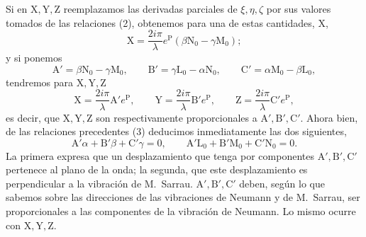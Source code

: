 Si en $\mathrm X,\mathrm Y,\mathrm Z$ reemplazamos las derivadas parciales
de $\xi,\eta,\zeta$ por sus valores tomados de las relaciones (2),
obtenemos para una de estas cantidades, $\mathrm X$,
\[
\mathrm X=\frac{2i\pi}{\lambda}e^{\mathrm P}(\beta\mathrm N_0-\gamma\mathrm M_0);
\]
y si ponemos
\begin{equation}
\mathrm A'=\beta\mathrm N_0-\gamma\mathrm M_0,\qquad
\mathrm B'=\gamma\mathrm L_0-\alpha\mathrm N_0,\qquad
\mathrm C'=\alpha\mathrm M_0-\beta\mathrm L_0,
\tag{3}
\end{equation}
tendremos para $\mathrm X,\mathrm Y,\mathrm Z$
\[
\mathrm X=\frac{2i\pi}{\lambda}\mathrm A'e^{\mathrm P},\qquad
\mathrm Y=\frac{2i\pi}{\lambda}\mathrm B'e^{\mathrm P},\qquad
\mathrm Z=\frac{2i\pi}{\lambda}\mathrm C'e^{\mathrm P},
\]
es decir, que $\mathrm X,\mathrm Y,\mathrm Z$ son respectivamente
proporcionales a $\mathrm A',\mathrm B',\mathrm C'$. Ahora bien, de las
relaciones precedentes (3) deducimos inmediatamente las dos siguientes,
\[
\mathrm A'\alpha+\mathrm B'\beta+\mathrm C'\gamma=0,\qquad
\mathrm A'\mathrm L_0+\mathrm B'\mathrm M_0+\mathrm C'\mathrm N_0=0.
\]
La primera expresa que un desplazamiento que tenga por componentes
$\mathrm A',\mathrm B',\mathrm C'$ pertenece al plano de la onda; la
segunda, que este desplazamiento es perpendicular a la vibración de
M.~Sarrau. $\mathrm A',\mathrm B',\mathrm C'$ deben, según lo que sabemos
sobre las direcciones de las vibraciones de Neumann y de M.~Sarrau, ser
proporcionales a las componentes de la vibración de Neumann. Lo mismo
ocurre con $\mathrm X,\mathrm Y,\mathrm Z$.

